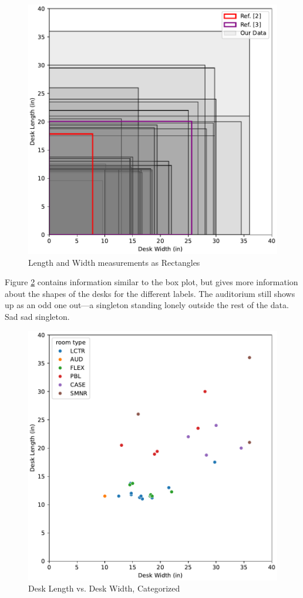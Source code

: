 \documentclass[conference]{IEEEtran}
\begin{document}
\begin{figure}[h]
    \includegraphics[width=\linewidth]{vis/rectangles.pdf}
    \caption{Length and Width measurements as Rectangles}
    \label{fig:rectangles}
\end{figure}

Figure \ref*{fig:rectanglesCAT} contains information similar to the box plot, but gives more information about the shapes of the desks for the different labels. The auditorium still shows up as an odd one out---a singleton standing lonely outside the rest of the data. Sad sad singleton.

\begin{figure}[h]
    \includegraphics[width=\linewidth]{vis/categorical_lw.pdf}
    \caption{Desk Length vs. Desk Width, Categorized}
    \label{fig:rectanglesCAT}
\end{figure}
\end{document}

